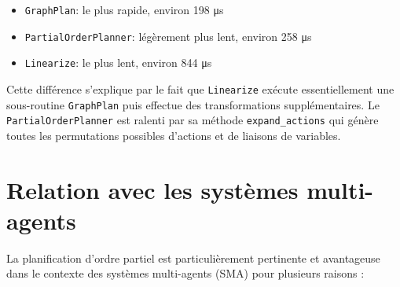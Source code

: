 \documentclass[a4paper,12pt]{report}
\begin{document}
\begin{itemize}
    \item \texttt{GraphPlan}: le plus rapide, environ 198 μs
    \item \texttt{PartialOrderPlanner}: légèrement plus lent, environ 258 μs
    \item \texttt{Linearize}: le plus lent, environ 844 μs
\end{itemize}

Cette différence s'explique par le fait que \texttt{Linearize} exécute essentiellement une sous-routine \texttt{GraphPlan} puis effectue des transformations supplémentaires. Le \texttt{PartialOrderPlanner} est ralenti par sa méthode \texttt{expand\_actions} qui génère toutes les permutations possibles d'actions et de liaisons de variables.

\section{Relation avec les systèmes multi-agents}
La planification d'ordre partiel est particulièrement pertinente et avantageuse dans le contexte des systèmes multi-agents (SMA) pour plusieurs raisons :
\end{document}
